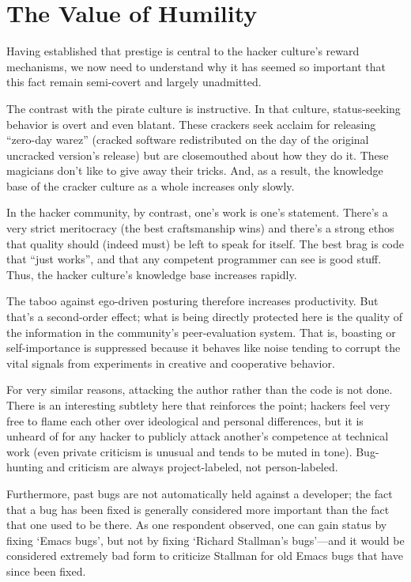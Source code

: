 \section{The Value of Humility}

Having established that prestige is central to the hacker culture's reward
mechanisms, we now need to understand why it has seemed so important that this
fact remain semi-covert and largely unadmitted.

The contrast with the pirate culture is instructive.  In that culture,
status-seeking behavior is overt and even blatant.  These crackers seek acclaim
for releasing ``zero-day warez'' (cracked software redistributed on the day of
the original uncracked version's release) but are closemouthed about how they do
it.  These magicians don't like to give away their tricks.  And, as a result,
the knowledge base of the cracker culture as a whole increases only slowly.

In the hacker community, by contrast, one's work is one's statement.  There's a
very strict meritocracy (the best craftsmanship wins) and there's a strong ethos
that quality should (indeed must) be left to speak for itself.  The best brag is
code that ``just works'', and that any competent programmer can see is good
stuff.  Thus, the hacker culture's knowledge base increases rapidly.

The taboo against ego-driven posturing therefore increases productivity.  But
that's a second-order effect; what is being directly protected here is the
quality of the information in the community's peer-evaluation system.  That is,
boasting or self-importance is suppressed because it behaves like noise tending
to corrupt the vital signals from experiments in creative and cooperative
behavior.

For very similar reasons, attacking the author rather than the code is not done.
There is an interesting subtlety here that reinforces the point; hackers feel
very free to flame each other over ideological and personal differences, but it
is unheard of for any hacker to publicly attack another's competence at
technical work (even private criticism is unusual and tends to be muted in
tone).  Bug-hunting and criticism are always project-labeled, not
person-labeled.

Furthermore, past bugs are not automatically held against a developer; the fact
that a bug has been fixed is generally considered more important than the fact
that one used to be there.  As one respondent observed, one can gain status by
fixing `Emacs bugs', but not by fixing `Richard Stallman's bugs'—and it would be
considered extremely bad form to criticize Stallman for old Emacs bugs that have
since been fixed.

